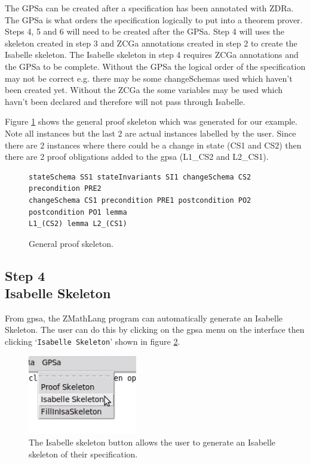 The GPSa can be created after a specification has been annotated with ZDRa. The GPSa is what orders the specification 
logically to put into a theorem prover. Steps 4, 5 and 6 will need to be created after the GPSa. Step 4 will uses the skeleton 
created in step 3 and ZCGa annotations created in step 2 to create the Isabelle skeleton. The Isabelle skeleton in
step 4 requires ZCGa annotations and the GPSa to be complete. Without the GPSa the logical order of the specification may not be correct
e.g. there may be some changeSchemas used which haven't been created yet. Without the ZCGa the some variables may be used which havn't been 
declared and therefore will not pass through Isabelle.

Figure \ref{fig:gpsaFullexample} shows the general proof skeleton which was
generated for our example. Note all instances but the last 2 are actual
instances labelled by the user. Since there are 2 instances where there could be
a change in state (CS1 and CS2) then there are 2 proof obligations added to the
\gls{gpsa} (L1\_CS2 and L2\_CS1).

\begin{figure}[H]
\centering
\begin{scriptsize}
\begin{BVerbatim}
stateSchema SS1 stateInvariants SI1 changeSchema CS2 precondition PRE2
changeSchema CS1 precondition PRE1 postcondition PO2 postcondition PO1 lemma
L1_(CS2) lemma L2_(CS1) 
\end{BVerbatim}
\end{scriptsize}
\caption{General proof skeleton. \label{fig:gpsaFullexample}}
\end{figure}

\subsection{Step 4\\Isabelle Skeleton}

From \gls{gpsa}, the ZMathLang program can automatically generate an Isabelle
Skeleton. The user can do this by clicking on the \gls{gpsa} menu on the
interface then clicking `\texttt{Isabelle Skeleton}' shown in figure
\ref{fig:isabutton}.

\begin{figure}[H]
\centering
\includegraphics[scale=1]{Figures/fullexample/isaskelbutton.png}
\caption{The Isabelle skeleton button allows the user to generate an Isabelle skeleton of their specification. \label{fig:isabutton}}
\end{figure}

